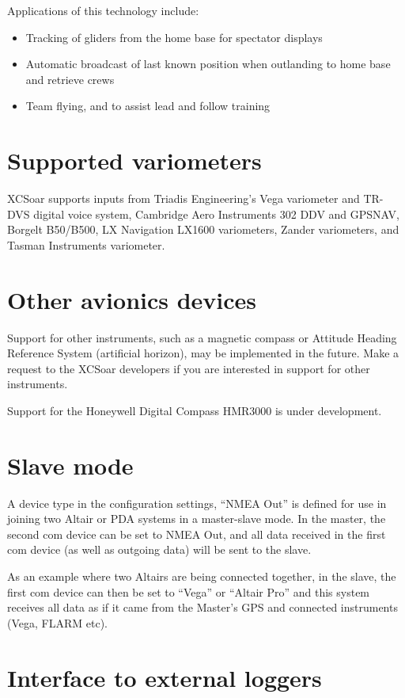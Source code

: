 \documentclass[a4paper,12pt]{refrep}
\begin{document}
Applications of this technology include:
\begin{itemize}
\item Tracking of gliders from the home base for spectator displays
\item Automatic broadcast of last known position when outlanding
  to home base and retrieve crews
\item Team flying, and to assist lead and follow training
\end{itemize}

\section{Supported variometers}

XCSoar supports inputs from Triadis Engineering's Vega variometer and
TR-DVS digital voice system, Cambridge Aero Instruments 302 DDV and
GPSNAV, Borgelt B50/B500, LX Navigation LX1600 variometers, Zander
variometers, and Tasman Instruments variometer.

\section{Other avionics devices}

Support for other instruments, such as a magnetic compass or Attitude
Heading Reference System (artificial horizon), may be implemented in
the future.  Make a request to the XCSoar developers if you are
interested in support for other instruments.

Support for the Honeywell Digital Compass HMR3000 is under
development.

\section{Slave mode}

A device type in the configuration settings, ``NMEA Out'' is defined
for use in joining two Altair or PDA systems in a master-slave mode.
In the master, the second com device can be set to NMEA Out, and all
data received in the first com device (as well as outgoing data) will
be sent to the slave.  

As an example where two Altairs are being connected together, in the
slave, the first com device can then be set to ``Vega'' or ``Altair
Pro'' and this system receives all data as if it came from the
Master's GPS and connected instruments (Vega, FLARM etc).

\section{Interface to external loggers}
\end{document}
